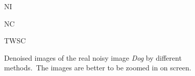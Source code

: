 \begin{figure}[t!]
{\begin{minipage}[t]{0.24\textwidth}
{\footnotesize NI  }
\end{minipage}
\begin{minipage}[t]{0.24\textwidth}
\centering
{}
{\footnotesize NC}
\end{minipage}
\begin{minipage}[t]{0.24\textwidth}
\centering
{}
{\footnotesize TWSC}
\end{minipage}
}\vspace{-3mm}
    \caption{Denoised images of the real noisy image \textsl{Dog} \cite{ncwebsite} by different methods.\ The images are better to be zoomed in on screen.}
    \label{fig5-7}
\end{figure}



